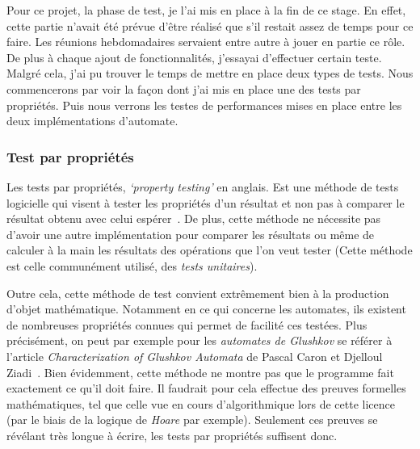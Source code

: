 Pour ce projet, la phase de test, je l'ai mis en place à la fin de ce stage. En 
effet, cette partie n'avait été prévue d'être réalisé que s'il restait assez de 
temps pour ce faire. Les réunions hebdomadaires servaient entre autre à jouer en 
partie ce rôle. De plus à chaque ajout de fonctionnalités, j'essayai d'effectuer 
certain teste. Malgré cela, j'ai pu trouver le temps de mettre en place deux 
types de tests. Nous commencerons par voir la façon dont j'ai mis en place une 
des tests par propriétés. Puis nous verrons les testes de performances mises en 
place entre les deux implémentations d'automate.

\subsubsection{Test par propriétés}

Les tests par propriétés, \textit{`property testing'} en anglais. Est une 
méthode de tests logicielle qui visent à tester les propriétés d'un résultat et 
non pas à comparer le résultat obtenu avec celui espérer~\cite{propertyTesting}. 
De plus, cette méthode ne nécessite pas d'avoir une autre implémentation pour 
comparer les résultats ou même de calculer à la main les résultats des 
opérations que l'on veut tester (Cette méthode est celle communément utilisé, 
des \textit{tests unitaires}). 

\vphantom{}

Outre cela, cette méthode de test convient extrêmement bien à la production 
d'objet mathématique. Notamment en ce qui concerne les automates, ils existent 
de nombreuses propriétés connues qui permet de facilité ces testées. Plus 
précisément, on peut par exemple pour les \textit{automates de Glushkov} se 
référer à l'article \textit{Characterization of Glushkov Automata} de Pascal 
Caron et Djelloul Ziadi~\cite{CaronZiadi2001}. Bien évidemment, cette méthode ne
montre pas que le programme fait exactement ce qu'il doit faire. Il faudrait 
pour cela effectue des preuves formelles mathématiques, tel que celle vue en 
cours d'algorithmique lors de cette licence (par le biais de la logique de 
\textit{Hoare} par exemple). Seulement ces preuves se révélant très longue à 
écrire, les tests par propriétés suffisent donc.  

\vphantom{}

